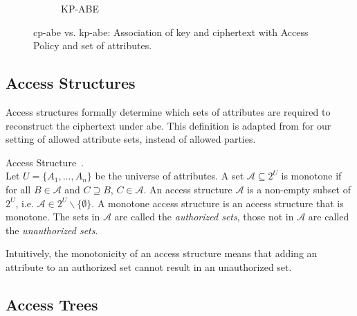 \begin{figure}
\begin{subfigure}[t]{0.4\textwidth}
        \caption{KP-ABE}
    \end{subfigure}
    \caption[\acrshort{cp-abe} vs. \acrshort{kp-abe}]{\acrshort{cp-abe} vs. \acrshort{kp-abe}: Association of key and ciphertext with Access Policy and set of attributes.}
    \label{fig:cp-kp-abe}
\end{figure}

\subsection{Access Structures}\label{sec:access-structures}
Access structures formally determine which sets of attributes are required to reconstruct the ciphertext under \acrshort{abe}.
This definition is adapted from \cite{beimel_secure_1996} for our setting of allowed attribute sets, instead of allowed parties.
\begin{definition}Access Structure~\cite{beimel_secure_1996}.\\
    Let $U = \{A_1, \dots, A_n\}$ be the universe of attributes.
    A set $\mathcal{A} \subseteq 2^{U}$ is monotone if for all $B \in \mathcal{A}$ and $C \supseteq B$,  $C \in \mathcal{A}$.
    An access structure $\mathcal{A}$ is a non-empty subset of $2^U$, i.e. $\mathcal{A} \in 2^U \backslash \{\emptyset\}$. A monotone access structure is an access structure that is monotone.
    The sets in $\mathcal{A}$ are called the \emph{authorized sets}, those not in $\mathcal{A}$ are called the \emph{unauthorized sets}.
\end{definition}

Intuitively, the monotonicity of an access structure means that adding an attribute to an authorized set cannot result in an unauthorized set. 

\subsection{Access Trees}\label{sec:access-trees}

